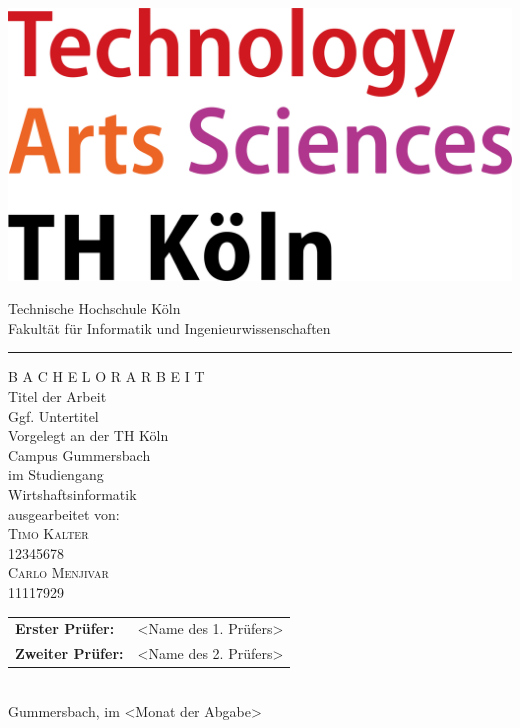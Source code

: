 \documentclass[a4paper,12pt,oneside]{article}
\begin{document}
  \pagestyle{empty} %
  \newpage %
  
  \newpage
  
  \pagestyle{empty}
  \begin{titlepage}
    \includegraphics[scale=0.20]{sources/TH_Koeln_Logo}\\
    \begin{center}
      \Large
      Technische Hochschule Köln\\
      Fakultät für Informatik und Ingenieurwissenschaften\\
      \hrule\par\rule{0pt}{2cm} %
      \LARGE
      \textsc{B A C H E L O R A R B E I T}\\
      \vspace{1cm} %
      \huge
      Titel der Arbeit\\
      \Large
      Ggf. Untertitel\\
      \vspace{1cm}
      \large
      Vorgelegt an der TH Köln\\
      Campus Gummersbach\\
      im Studiengang\\
      Wirtshaftsinformatik\\ 
      \vspace{1.0cm}
      ausgearbeitet von:\\
      \textsc{Timo Kalter}\\
       12345678\\
      \textsc{Carlo Menjivar}\\
      11117929\\
      \vspace{1.5cm}
      \begin{tabular}{ll} %
          \textbf{Erster Prüfer:} & <Name des 1. Prüfers> \\
          \textbf{Zweiter Prüfer:} & <Name des 2. Prüfers> \\
      \end{tabular}
      \vspace{1.5cm}
      \\Gummersbach, im <Monat der Abgabe>
    \end{center}    
  \end{titlepage}
  
\end{document}

